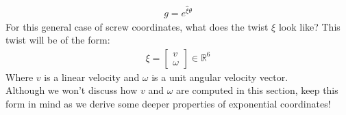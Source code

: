 \documentclass[oneside]{book}
\begin{document}
\begin{align}
    g = e^{\hat\xi\theta}
\end{align}
For this general case of screw coordinates, what does the twist $\xi$ look like? This twist will be of the form:
\begin{align}
    \xi = 
    \begin{bmatrix}
        v\\
        \omega
    \end{bmatrix} \in \mathbb{R}^6
\end{align}
Where $v$ is a linear velocity and $\omega$ is a unit angular velocity vector.\\
Although we won't discuss how $v$ and $\omega$ are computed in this section, keep this form in mind as we derive some deeper properties of exponential coordinates!
\end{document}
